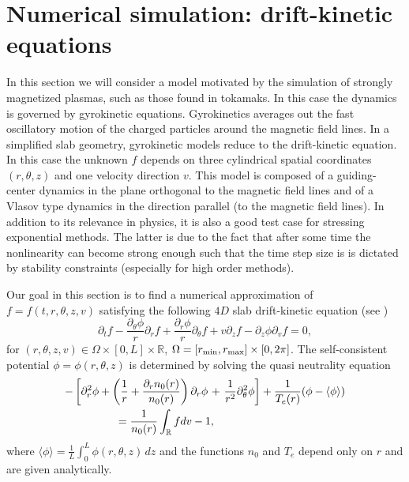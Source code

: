  
\section{Numerical simulation: drift-kinetic equations \label{sec:dk}}

In this section we will consider a model motivated by the simulation of strongly magnetized plasmas, such as those found in tokamaks. In this case the dynamics is governed by gyrokinetic equations. Gyrokinetics averages out the fast oscillatory motion of the charged particles around the magnetic field lines. In a simplified slab geometry, gyrokinetic models reduce to the drift-kinetic equation. In this case the unknown $f$ depends on three cylindrical spatial coordinates $(r,\theta,z)$ and one velocity direction $v$. This model is composed of a guiding-center dynamics in the plane orthogonal to the magnetic field lines and of a Vlasov type dynamics in the direction parallel (to the magnetic field lines). In addition to its relevance in physics, it is also a good test case for stressing exponential methods. The latter is due to the fact that after some time the nonlinearity can become strong enough such that the time step size is is dictated by stability constraints (especially for high order methods).

Our goal in this section is to find a numerical approximation of $f=f(t,r,\theta,z,v)$ satisfying the following $4D$ slab drift-kinetic equation (see \cite{grandgirard})
\begin{equation}
\label{dk}
\partial_tf-\frac{\partial_\theta \phi}{r}\partial_rf+\frac{\partial_r \phi}{r}\partial_\theta f
+v\partial_zf-\partial_z\phi\partial_{v}f=0,
\end{equation}
for $(r,\theta,z,v)\in \Omega\times[0,L]\times \mathbb{R}$, $\Omega=[r_{\rm min},r_{\rm max}]\times [0, 2\pi]$.
The self-consistent potential $\phi=\phi(r,\theta,z)$ is determined by solving the quasi neutrality equation
\begin{align}
    -\left[\partial_r^2\phi+\left(\frac{1}{r}+\frac{\partial_r n_0(r)}{n_0(r)}\right)\partial_r\phi \right.&+\left.\frac{1}{r^2}\partial_\theta^2\phi\right]+\frac{1}{T_e(r)}(\phi-\langle\phi\rangle)\nonumber\\
\label{qn}
&\hspace{-3cm}=\frac{1}{n_0(r)}\int_{\mathbb{R}} fdv-1,
\end{align}
where $\langle\phi\rangle = \frac{1}{L}\int_0^L \phi(r,\theta,z)\,dz$ and the functions $n_0$ and $T_e$ depend only on $r$ and are given analytically.


